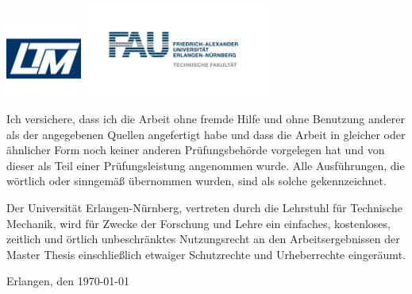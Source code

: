 \documentclass[a4paper,12pt,BCOR0mm,headsepline,final,twoside]{scrbook}
\newcommand{\thethesis}[0]{%
  Master Thesis
}
\begin{document}
\begin{titlepage}
\begin{center}
  \end{center}
  \includegraphics[width=2.5cm]{ltm.png}\hspace*{9cm}~\includegraphics[width=6cm]{logo_fau.jpg}
\end{titlepage}

\clearpage{\pagestyle{empty}\cleardoublepage}

\thispagestyle{empty}
Ich versichere, dass ich die Arbeit ohne fremde Hilfe und ohne Benutzung
anderer als der angegebenen Quellen angefertigt habe und dass die Arbeit in
gleicher oder \"ahnlicher Form noch keiner anderen Pr\"ufungsbeh\"orde
vorgelegen hat und von dieser als Teil einer Pr\"ufungsleistung angenommen
wurde. Alle Ausf\"uhrungen, die w\"ortlich oder sinngem\"a\ss{} \"ubernommen
wurden, sind als solche gekennzeichnet.

\vspace{2cm}

Der Universit\"at Erlangen-N\"urnberg, vertreten durch die Lehrstuhl f\"ur Technische Mechanik, wird f\"ur Zwecke der Forschung und Lehre ein einfaches,
kostenloses, zeitlich und \"ortlich unbeschr\"anktes Nutzungsrecht an den
Arbeitsergebnissen der \thethesis einschlie\ss{}lich etwaiger Schutzrechte und
Urheberrechte einger\"aumt.

\vspace{2cm}
Erlangen, den \today

\vspace{2cm}
 \hfill \ 

\vspace{0,5cm}

\clearpage{\pagestyle{empty}\cleardoublepage}

%

\pagestyle{empty}

\clearpage{\pagestyle{plain}\cleardoublepage}
\end{document}
